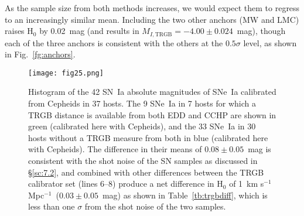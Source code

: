 \documentclass[12pt]{aastex631}
\newcommand{\kmss }{km s$^{-1}$ Mpc$^{-1}$\ }
\begin{document}
As the sample size from both methods increases, we would expect them to regress to an increasingly similar mean. Including the two other anchors (MW and LMC) raises H$_0$ by 0.02~mag (and results in $M_{I,\textrm{TRGB}}=-4.00\pm0.024$~mag), though each of the three anchors is consistent with the others at the $0.5\sigma$ level, as shown in Fig.~\ref{fg:anchors}.

\begin{figure}[t]  
\begin{center}
\texttt{[image: fig25.png]}
\end{center}
\caption{\label{fg:compmb} Histogram of the 42 SN~Ia absolute magnitudes of SNe~Ia calibrated from Cepheids in 37 hosts. The 9 SNe~Ia in 7 hosts for which a TRGB distance is available from both EDD and CCHP are shown in green (calibrated here with Cepheids), and the 33 SNe~Ia in 30 hosts without a TRGB measure from both in blue (calibrated here with Cepheids).  The difference in their means of $0.08\pm 0.05$~mag  is consistent with the shot noise of the SN samples as discussed in \S\ref{sc:7.2}, and combined with other differences between the TRGB calibrator set (lines 6--8) produce a net difference in H$_0$ of 1~\kmss ($0.03 \pm 0.05$~mag) as shown in Table~\ref{tb:trgbdiff}, which is less than one $\sigma$ from the shot noise of the two samples.}
\end{figure}
\end{document}
